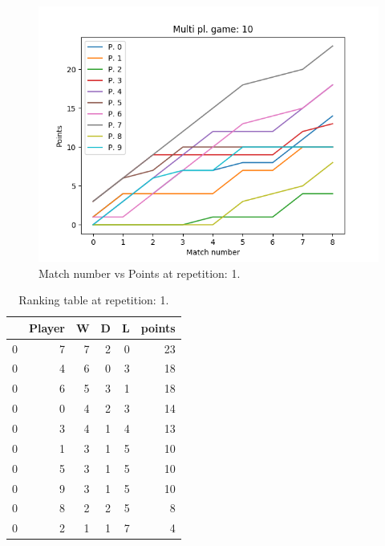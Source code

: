\documentclass[journal,a4paper,10pt,twoside]{IEEEtran}
\begin{document}
\begin{figure}
    \centering
    \includegraphics[width=1\columnwidth]{img_v1/cidpmp-scores-10.png}
    \caption{Match number vs Points at repetition: 1.}
    \label{fig:cmpipd1}
\end{figure}

\begin{table}[]
    \centering
    \begin{tabular}{lrrrrr}
    \toprule
    {} &  Player &  W &  D &  L &  points \\
    \midrule
    0 &       7 &  7 &  2 &  0 &      23 \\
    0 &       4 &  6 &  0 &  3 &      18 \\
    0 &       6 &  5 &  3 &  1 &      18 \\
    0 &       0 &  4 &  2 &  3 &      14 \\
    0 &       3 &  4 &  1 &  4 &      13 \\
    0 &       1 &  3 &  1 &  5 &      10 \\
    0 &       5 &  3 &  1 &  5 &      10 \\
    0 &       9 &  3 &  1 &  5 &      10 \\
    0 &       8 &  2 &  2 &  5 &       8 \\
    0 &       2 &  1 &  1 &  7 &       4 \\
    \bottomrule
    \end{tabular}
    \caption{Ranking table at repetition: 1.}
    \label{tab:cmpipd1}
\end{table}

%
%
\end{document}
